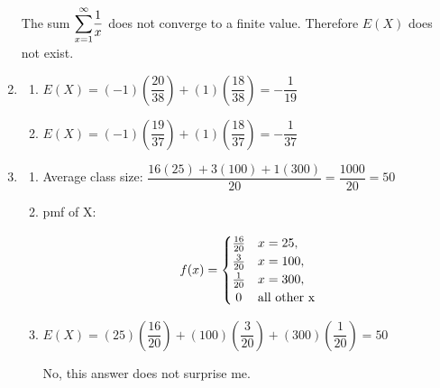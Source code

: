 \documentclass{article}
\begin{document}
\begin{enumerate}
	The sum $\mathlarger{\sum}_{x=1}^\infty{\dfrac{1}{x}}$ does not converge to a finite
	value. Therefore $E(X)$ does not exist.
     \addtocounter{enumi}{2}
     
     \item
	\begin{enumerate}
	 \item 
	    $E(X) = (-1)\left(\dfrac{20}{38}\right) + (1)\left(\dfrac{18}{38}\right) = -\dfrac{1}{19}$
	    
	 \item
	    $E(X) = (-1)\left(\dfrac{19}{37}\right) + (1)\left(\dfrac{18}{37}\right) = -\dfrac{1}{37}$
	\end{enumerate}
     \addtocounter{enumi}{2}
	
     \item
	\begin{enumerate}
	 \item 
	    Average class size: $\dfrac{16(25) + 3(100) + 1(300)}{20} = \dfrac{1000}{20} = 50$
	  
	 \item
	    pmf of X:
	    
	    \[  f(x) = 	    
		\begin{cases}
	         \hfill \frac{16}{20} \hfill & x=25, \\
	         \hfill \frac{3}{20}  \hfill & x=100, \\
	         \hfill \frac{1}{20}  \hfill & x=300, \\
	         \hfill 0	      \hfill & \text{all other x} \\
	        \end{cases} \]	    
	    
	 \item
	    $E(X) = (25)\left(\dfrac{16}{20}\right) + (100)\left(\dfrac{3}{20}\right)
		    + (300)\left(\dfrac{1}{20}\right) = 50$
		    
	    No, this answer does not surprise me.
	\end{enumerate}

      
    \end{enumerate}
\end{document}

